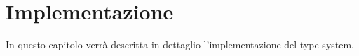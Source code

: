 \section{Implementazione}

In questo capitolo verr\`a descritta in dettaglio l'implementazione del
type system.


